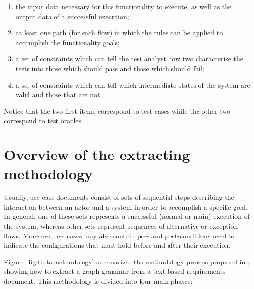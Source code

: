 \begin{enumerate}
\item the input data necessary for this functionality to execute, as well as the output data of a successful execution;

\item at least one path (for each flow) in which the rules can be applied to accomplish the functionality goals;

\item a set of constraints which can tell the test analyst how two characterize the tests into those which should pass and those which should fail;

\item a set of constraints which can tell which intermediate states of the system are valid and those that are not.
\end{enumerate}

Notice that the two first items correspond to test cases while the other two correspond to test oracles.


\section{Overview of the extracting methodology}

Usually, use case documents consist of sets of sequential steps describing the interaction between an actor and a system in order to accomplish a specific goal. In general, one of these sets represents a successful (normal or main) execution of the system, whereas other sets represent sequences of alternative or exception flows. Moreover, use cases may also contain pre- and post-conditions used to indicate the configurations that must hold before and after their execution.

Figure~\ref{fig:tests:methodology} summarizes the methodology process proposed in \cite{Junior2015}, showing how to extract a graph grammar from a text-based requirements document. This methodology is divided into four main phases:

